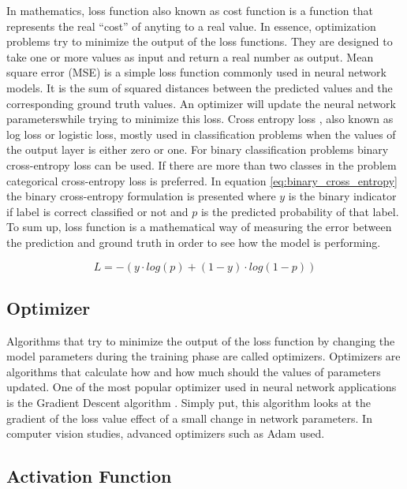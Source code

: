 In mathematics, loss function also known as cost function is a function that represents the real “cost” of anyting to a real value. In essence, optimization problems try to minimize the output of the loss functions. They are designed to take one or more values as input and return a real number as output. Mean square error (MSE) is a simple loss function commonly used in neural network models. It is the sum of squared distances between the predicted values and the corresponding ground truth values. An optimizer will update the neural network parameterswhile trying to minimize this loss. Cross entropy loss \cite{cross_entropy}, also known as log loss or logistic loss, mostly used in classification problems when the values of the output layer is either zero or one. For binary classification problems binary cross-entropy loss can be used. If there are more than two classes in the problem categorical cross-entropy loss is preferred. In equation \ref{eq:binary_cross_entropy} the binary cross-entropy formulation is presented where \(y\) is the binary indicator if label is correct classified or not and \(p\) is the predicted probability of that label. To sum up, loss function is a mathematical way of measuring the error between the prediction and ground truth in order to see how the model is performing.

\begin{equation}
    L = -(y \cdot log(p) + (1-y) \cdot log(1 - p))
    \label{eq:binary_cross_entropy}
\end{equation}

\subsection{Optimizer}

Algorithms that try to minimize the output of the loss function by changing the model parameters during the training phase are called optimizers. Optimizers are algorithms that calculate how and how much should the values of parameters updated. One of the most popular optimizer used in neural network applications is the Gradient Descent algorithm \cite{gradient_descent}. Simply put, this algorithm looks at the gradient of the loss value effect of a small change in network parameters. In computer vision studies, advanced optimizers such as Adam \cite{adam} used.

\subsection{Activation Function}


